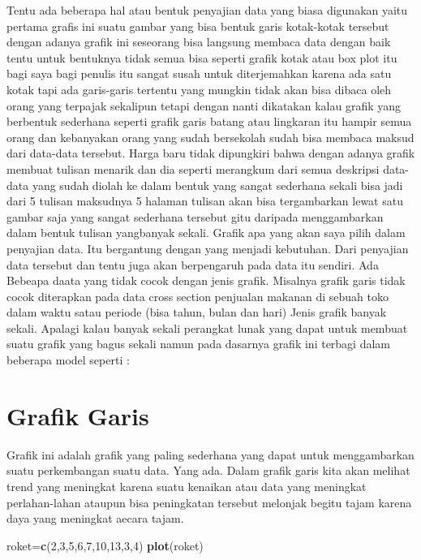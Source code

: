 \documentclass[
]{book}
\newenvironment{Shaded}{\begin{snugshade}}{\end{snugshade}}
\newcommand{\DecValTok}[1]{\textcolor[rgb]{0.00,0.00,0.81}{#1}}
\newcommand{\FunctionTok}[1]{\textcolor[rgb]{0.13,0.29,0.53}{\textbf{#1}}}
\newcommand{\NormalTok}[1]{#1}
\newcommand{\OtherTok}[1]{\textcolor[rgb]{0.56,0.35,0.01}{#1}}
\theoremstyle{definition}
\theoremstyle{definition}
\theoremstyle{definition}
\theoremstyle{definition}
\theoremstyle{remark}
\begin{document}
Tentu ada beberapa hal atau bentuk penyajian data yang biasa digunakan yaitu pertama grafis ini suatu gambar yang bisa bentuk garis kotak-kotak tersebut dengan adanya grafik ini seseorang bisa langsung membaca data dengan baik tentu untuk bentuknya tidak semua bisa seperti grafik kotak atau box plot itu bagi saya bagi penulis itu sangat susah untuk diterjemahkan karena ada satu kotak tapi ada garis-garis tertentu yang mungkin tidak akan bisa dibaca oleh orang yang terpajak sekalipun tetapi dengan nanti dikatakan kalau grafik yang berbentuk sederhana seperti grafik garis batang atau lingkaran itu hampir semua orang dan kebanyakan orang yang sudah bersekolah sudah bisa membaca maksud dari data-data tersebut. Harga baru tidak dipungkiri bahwa dengan adanya grafik membuat tulisan menarik dan dia seperti merangkum dari semua deskripsi data-data yang sudah diolah ke dalam bentuk yang sangat sederhana sekali bisa jadi dari 5 tulisan maksudnya 5 halaman tulisan akan bisa tergambarkan lewat satu gambar saja yang sangat sederhana tersebut gitu daripada menggambarkan dalam bentuk tulisan yangbanyak sekali.
Grafik apa yang akan saya pilih dalam penyajian data. Itu bergantung dengan yang menjadi kebutuhan. Dari penyajian data tersebut dan tentu juga akan berpengaruh pada data itu sendiri. Ada
Bebeapa daata yang tidak cocok dengan jenis grafik. Misalnya grafik garis tidak cocok diterapkan pada data cross section penjualan makanan di sebuah toko dalam waktu satau periode (bisa tahun, bulan dan hari)
Jenis grafik banyak sekali. Apalagi kalau banyak sekali perangkat lunak yang dapat untuk membuat suatu grafik yang bagus sekali namun pada dasarnya grafik ini terbagi dalam beberapa model seperti :

\hypertarget{grafik-garis}{%
\section{Grafik Garis}\label{grafik-garis}}

Grafik ini adalah grafik yang paling sederhana yang dapat untuk menggambarkan suatu perkembangan suatu data. Yang ada. Dalam grafik garis kita akan melihat trend yang meningkat karena suatu kenaikan atau data yang meningkat perlahan-lahan ataupun bisa peningkatan tersebut melonjak begitu tajam karena daya yang meningkat aecara tajam.

\begin{Shaded}
\begin{Highlighting}[]
\NormalTok{roket}\OtherTok{=}\FunctionTok{c}\NormalTok{(}\DecValTok{2}\NormalTok{,}\DecValTok{3}\NormalTok{,}\DecValTok{5}\NormalTok{,}\DecValTok{6}\NormalTok{,}\DecValTok{7}\NormalTok{,}\DecValTok{10}\NormalTok{,}\DecValTok{13}\NormalTok{,}\DecValTok{3}\NormalTok{,}\DecValTok{4}\NormalTok{)}
\FunctionTok{plot}\NormalTok{(roket)}
\end{Highlighting}
\end{Shaded}
\end{document}
